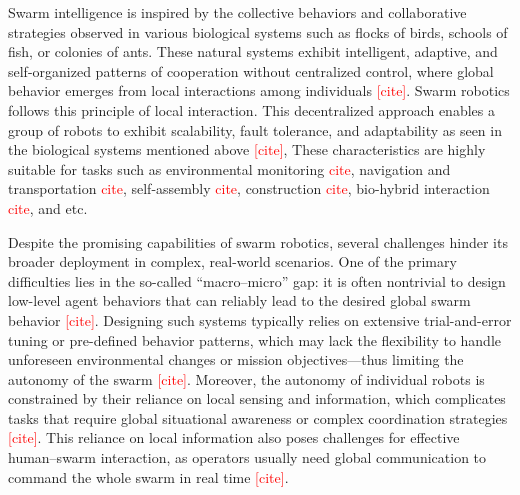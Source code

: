Swarm intelligence is inspired by the collective behaviors and collaborative strategies observed in various biological systems such as flocks of birds, schools of fish, or colonies of ants.
These natural systems exhibit intelligent, adaptive, and self-organized patterns of cooperation without centralized control, where global behavior emerges from local interactions among individuals \textcolor{red}{[cite]}.
Swarm robotics follows this principle of local interaction.
This decentralized approach enables a group of robots to exhibit scalability, fault tolerance, and adaptability as seen in the biological systems mentioned above \textcolor{red}{[cite]},
These characteristics are highly suitable for tasks such as
environmental monitoring \textcolor{red}{cite},
navigation and transportation \textcolor{red}{cite},
self-assembly \textcolor{red}{cite},
construction \textcolor{red}{cite},
bio-hybrid interaction \textcolor{red}{cite},
and etc.


Despite the promising capabilities of swarm robotics, several challenges hinder its broader deployment in complex, real-world scenarios.
One of the primary difficulties lies in the so-called “macro–micro” gap: it is often nontrivial to design low-level agent behaviors that can reliably lead to the desired global swarm behavior \textcolor{red}{[cite]}.
Designing such systems typically relies on extensive trial-and-error tuning or pre-defined behavior patterns, which may lack the flexibility to handle unforeseen environmental changes or mission objectives—thus limiting the autonomy of the swarm \textcolor{red}{[cite]}.
Moreover, the autonomy of individual robots is constrained by their reliance on local sensing and information, which complicates tasks that require global situational awareness or complex coordination strategies \textcolor{red}{[cite]}.
This reliance on local information also poses challenges for effective human–swarm interaction, as operators usually need global communication to command the whole swarm in real time \textcolor{red}{[cite]}.

